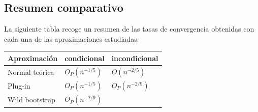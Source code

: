 \documentclass[]{book}
\theoremstyle{definition}
\theoremstyle{definition}
\theoremstyle{definition}
\theoremstyle{remark}
\begin{document}
\subsection{Resumen comparativo}\label{resumen-comparativo}

La siguiente tabla recoge un resumen de las tasas de convergencia
obtenidas con cada una de las aproximaciones estudiadas:

\begin{longtable}[]{@{}lll@{}}
\toprule
\begin{minipage}[b]{0.25\columnwidth}\raggedright\strut
Aproximación\strut
\end{minipage} & \begin{minipage}[b]{0.37\columnwidth}\raggedright\strut
condicional\strut
\end{minipage} & \begin{minipage}[b]{0.29\columnwidth}\raggedright\strut
incondicional\strut
\end{minipage}\tabularnewline
\midrule
\endhead
\begin{minipage}[t]{0.25\columnwidth}\raggedright\strut
Normal teórica\strut
\end{minipage} & \begin{minipage}[t]{0.37\columnwidth}\raggedright\strut
\(O_{P}\left( n^{-1/5}\right)\)\strut
\end{minipage} & \begin{minipage}[t]{0.29\columnwidth}\raggedright\strut
\(O\left(n^{-2/5}\right)\)\strut
\end{minipage}\tabularnewline
\begin{minipage}[t]{0.25\columnwidth}\raggedright\strut
Plug-in\strut
\end{minipage} & \begin{minipage}[t]{0.37\columnwidth}\raggedright\strut
\(O_{P}\left( n^{-1/5}\right)\)\strut
\end{minipage} & \begin{minipage}[t]{0.29\columnwidth}\raggedright\strut
\(O_{P}\left( n^{-2/9}\right)\)\strut
\end{minipage}\tabularnewline
\begin{minipage}[t]{0.25\columnwidth}\raggedright\strut
Wild bootstrap\strut
\end{minipage} & \begin{minipage}[t]{0.37\columnwidth}\raggedright\strut
\(O_{P}\left( n^{-2/9}\right)\)\strut
\end{minipage} & \begin{minipage}[t]{0.29\columnwidth}\raggedright\strut

\end{minipage}
\end{longtable}
\end{document}
